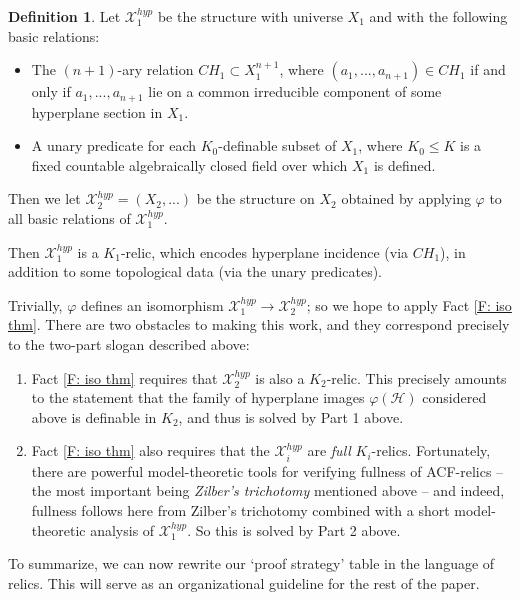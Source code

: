 \documentclass{amsart}
\theoremstyle{definition}
\newtheorem{definition}[theorem]{Definition}
\begin{document}
\begin{definition}
    Let $\mathcal X_1^{hyp}$ be the structure with universe $X_1$ and with the following basic relations:
    \begin{itemize}
        \item The $(n+1)$-ary relation $CH_1\subset X_1^{n+1}$, where $(a_1,...,a_{n+1})\in CH_1$ if and only if $a_1,...,a_{n+1}$ lie on a common irreducible component of some hyperplane section in $X_1$.
        \item A unary predicate for each $K_0$-definable subset of $X_1$, where $K_0\leq K$ is a fixed countable algebraically closed field over which $X_1$ is defined.
    \end{itemize}
    Then we let $\mathcal X_2^{hyp}=(X_2,...)$ be the structure on $X_2$ obtained by applying $\varphi$ to all basic relations of $\mathcal X_1^{hyp}$.
\end{definition}

Then $\mathcal X_1^{hyp}$ is a $K_1$-relic, which encodes hyperplane incidence (via $CH_1$), in addition to some topological data (via the unary predicates).

Trivially, $\varphi$ defines an isomorphism $\mathcal X_1^{hyp}\rightarrow\mathcal X_2^{hyp}$; so we hope to apply Fact \ref{F: iso thm}. There are two obstacles to making this work, and they correspond precisely to the two-part slogan described above:

\begin{enumerate}
    \item Fact \ref{F: iso thm} requires that $\mathcal X_2^{hyp}$ is also a $K_2$-relic. This precisely amounts to the statement that the family of hyperplane images $\varphi(\mathcal H)$ considered above is definable in $K_2$, and thus is solved by Part 1 above.
    \item Fact \ref{F: iso thm} also requires that the $\mathcal X_i^{hyp}$ are \textit{full} $K_i$-relics. Fortunately, there are powerful model-theoretic tools for verifying fullness of ACF-relics -- the most important being \textit{Zilber's trichotomy} mentioned above -- and indeed, fullness follows here from Zilber's trichotomy combined with a short model-theoretic analysis of $\mathcal X_1^{hyp}$. So this is solved by Part 2 above.
\end{enumerate}

To summarize, we can now rewrite our `proof strategy' table in the language of relics. This will serve as an organizational guideline for the rest of the paper.
\end{document}
